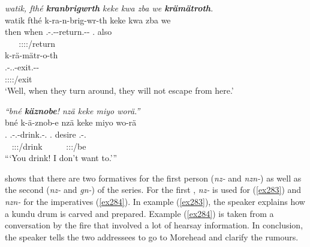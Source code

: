 \begin{exe}
	\ex \emph{watik, fthé \textbf{kranbrigwrth} keke kwa zba we \textbf{krämätroth}.}\\
	\glll watik fthé k-ra-n-brig-wr-th keke kwa zba we\\
	then when \M.\Bet-\Irr.\Vc-\Venit-return.\Ext-\Ndu-\Stnsg{} {\Neg} {\Fut} \Prox.{\Abl} also\\
	~ ~ {\footnotesize \Stpl:\Sbj:\Irr:\Ipfv:\Venit/return} ~ ~ ~ ~\\
	\sn
	\glll k-rä-mätr-o-th\\
	\M.\Bet-\Irr.\Vc.\Ndu-exit.\Rs-\Andat-\Nsg{}\\
	{\footnotesize \Pl:\Sbj:\Irr:\Pfv:\Andat/exit}\\
	\trans `Well, when they turn around, they will not escape from here.'\\ 
	\label{ex330}
\end{exe}
\begin{exe}
	\ex \emph{``bné \textbf{käznobe}! nzä keke miyo worä.''}\\
	\glll bné k-ä-znob-e nzä keke miyo wo-rä\\
	\Snsg.{\Erg} \M.\Bet-\Ndu.\Vc-drink.\Rs-\Snsg.{\Imp} \Fsg.{\Abs} {\Neg} desire \Fsg.\Alph-\Cop.\Ndu\\
	~ {\footnotesize \Spl:\Sbj:\Imp:\Pfv/drink} ~ ~ ~ {\footnotesize \Fsg:\Sbj:\Nonpast:\Ipfv/be}\\
	\trans ```You drink! I don't want to.''' 
	\label{ex278}
\end{exe}

 shows that there are two formatives for the first person  (\emph{nz-} and \emph{nzn-}) as well as the second  (\emph{nz-} and \emph{gn-}) of the \Bet{} series. For the first  , \emph{nz-} is used for  (\ref{ex283}) and \emph{nzn-} for the imperatives (\ref{ex284}). In example (\ref{ex283}), the speaker explains how a kundu drum is carved and prepared. Example (\ref{ex284}) is taken from a conversation by the fire that involved a lot of hearsay information. In conclusion, the speaker tells the two addressees to go to Morehead and clarify the rumours.

